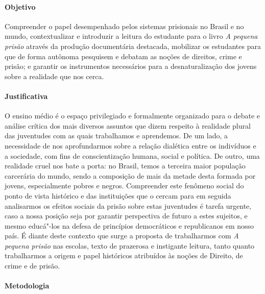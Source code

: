 \documentclass[11pt]{extarticle}
\begin{document}
\paragraph{Objetivo} Compreender o papel desempenhado pelos sistemas
prisionais no Brasil e no mundo, contextualizar e introduzir a leitura do
estudante para o livro \emph{A pequena prisão} através da produção
documentária destacada, mobilizar os estudantes para que de forma
autônoma pesquisem e debatam as noções de direitos, crime e prisão; e
garantir os instrumentos necessários para a desnaturalização dos jovens
sobre a realidade que nos cerca.

\paragraph{Justificativa} O ensino médio é o espaço privilegiado e
formalmente organizado para o debate e análise crítica dos mais diversos
assuntos que dizem respeito à realidade plural das juventudes com as
quais trabalhamos e aprendemos. De um lado, a necessidade de nos
aprofundarmos sobre a relação dialética entre os indivíduos e a
sociedade, com fins de conscientização humana, social e política. De
outro, uma realidade cruel nos bate a porta: no Brasil, temos a terceira
maior população carcerária do mundo, sendo a composição de mais da
metade desta formada por jovens, especialmente pobres e negros.
Compreender este fenômeno social do ponto de vista histórico e das
instituições que o cercam para em seguida analisarmos os efeitos sociais
da prisão sobre estas juventudes é tarefa urgente, caso a nossa posição
seja por garantir perspectiva de futuro a estes sujeitos, e mesmo
educá"-los na defesa de princípios democráticos e republicanos em nosso
país. É diante deste contexto que surge a proposta de trabalharmos com
\emph{A pequena prisão} nas escolas, texto de prazerosa e instigante
leitura, tanto quanto trabalharmos a origem e papel históricos
atribuídos às noções de Direito, de crime e de prisão.

\paragraph{Metodologia} 
\end{document}
